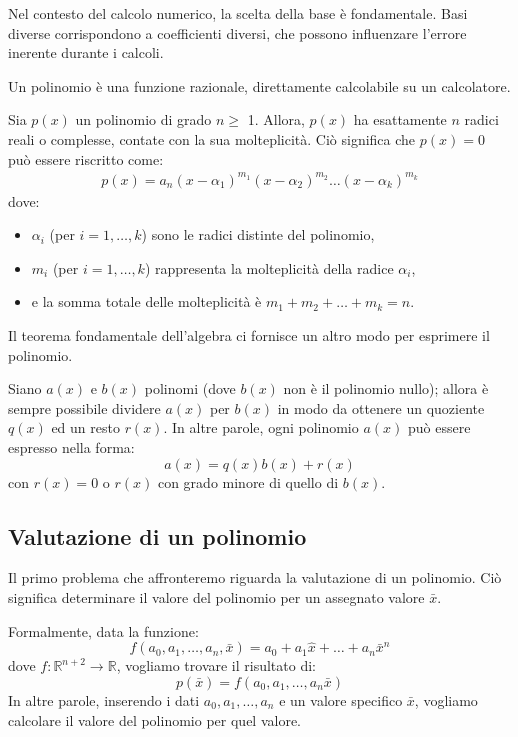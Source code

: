 \documentclass{article}
\begin{document}
Nel contesto del calcolo numerico, la scelta della base è fondamentale. Basi
diverse corrispondono a coefficienti diversi, che possono influenzare l'errore
inerente durante i calcoli.
\begin{oss}
    Un polinomio è una funzione razionale, direttamente calcolabile su un
    calcolatore.
\end{oss}
\begin{theorem}
    Sia $p(x)$ un polinomio di grado $n  \geq$ 1. Allora, $p(x)$ ha 
    esattamente $n$ radici reali o complesse, contate con la sua
    molteplicità. Ciò significa che $p(x)=0$ può essere riscritto come:
    \begin{equation}
        \begin{aligned} \label{eq:teorema_divisione_polinomi}
           p(x)=a_n(x-\alpha_1)^{m_1}(x-\alpha_2)^{m_2}\ldots(x-\alpha_k)^{m_k}
       \end{aligned} 
    \end{equation}
    dove:
    \begin{itemize}
        \item $\alpha_i$ (per $i=1,\ldots,k$) sono le radici distinte del polinomio,
       \item $m_i$ (per $i=1,\ldots,k$) rappresenta la molteplicità della radice
       $\alpha_i$,
       \item e la somma totale delle molteplicità è $m_1+m_2+\ldots+m_k=n$.
    \end{itemize}
\end{theorem}
Il teorema fondamentale dell'algebra ci fornisce un altro modo per esprimere
il polinomio.
\begin{theorem}
    Siano $a(x)$ e $b(x)$ polinomi (dove $b(x)$ non è il polinomio nullo); 
    allora è sempre possibile dividere $a(x)$ per $b(x)$ in modo da ottenere
    un quoziente $q(x)$ ed un resto $r(x)$. In altre parole, ogni polinomio
    $a(x)$ può essere espresso nella forma: 
    $$a(x)=q(x)b(x)+r(x)$$
    con $r(x)=0$ o $r(x)$ con grado minore di quello di $b(x)$.
\end{theorem}
\subsection{Valutazione di un polinomio}
Il primo problema che affronteremo riguarda la valutazione di un polinomio.
Ciò significa determinare il valore del polinomio per un assegnato valore $\bar{x}$.

Formalmente, data la funzione:
$$f(a_0,a_1,\ldots,a_n,\bar{x})=a_0+a_1\hat{x}+\ldots+a_n\bar{x}^n$$
dove $f:\mathbb{R}^{n+2}\rightarrow \mathbb{R}$, vogliamo trovare il risultato
di:
$$p(\bar{x})=f(a_0,a_1,\ldots,a_n\bar{x})$$
In altre parole, inserendo i dati $a_0,a_1,\ldots,a_n$ e un valore specifico
$\bar{x}$, vogliamo calcolare il valore del polinomio per quel valore.
\end{document}
